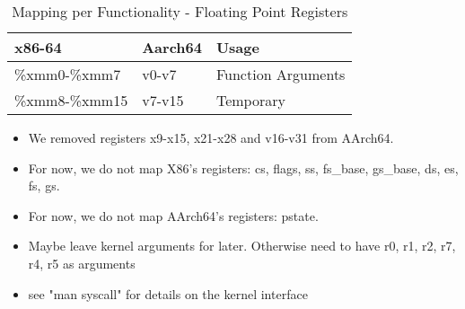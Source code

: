 \documentclass[11pt]{article}
\begin{document}
\begin{center}
\begin{table}[ht]
\caption{Mapping per Functionality - Floating Point Registers}
\begin{tabular}{|l|l|l|}
    \hline
    \textbf{x86-64} & \textbf{Aarch64} & \textbf{Usage} \\
    \hline
    \%xmm0-\%xmm7 & v0-v7 & Function Arguments \\
    \hline
    \%xmm8-\%xmm15 & v7-v15 & Temporary \\
    \hline
\end{tabular}
\label{tab:mappings_per_func2}
\end{table}
\end{center}

    \begin{itemize}
        \item We removed registers x9-x15, x21-x28 and v16-v31 from AArch64.
        \item For now, we do not map X86's registers: cs, flags, ss, fs\_base, gs\_base, ds, es, fs, gs.
        \item For now, we do not map AArch64's registers: pstate.
        \item Maybe leave kernel arguments for later.
        Otherwise need to have r0, r1, r2, r7, r4, r5 as arguments
        \item see "man syscall" for details on the kernel interface
    \end{itemize}
\end{document}
